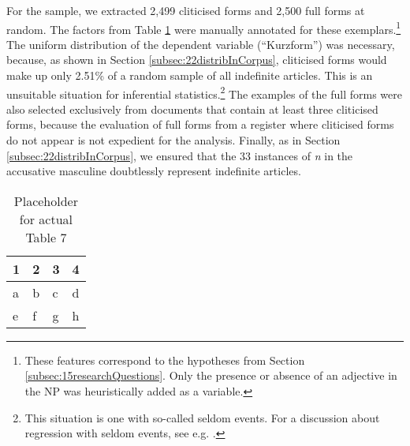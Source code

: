 For the sample, we extracted 2,499 cliticised forms and 2,500 full forms at random.
The factors from Table \ref{tab:0007} were manually annotated for these exemplars.\footnote{
	\label{fn:23} These features correspond to the hypotheses from Section \ref{subsec:15researchQuestions}. Only the presence or absence of an adjective in the NP was heuristically added as a variable.}
The uniform distribution of the dependent variable (``Kurzform'') was necessary, because, as shown in Section \ref{subsec:22distribInCorpus}, cliticised forms would make up only 2.51\% of a random sample of all indefinite articles.
This is an unsuitable situation for inferential statistics.\footnote{
	This situation is one with so-called seldom events. For a discussion about regression with seldom events, see e.g. \citet{KingZeng2001}.}
The examples of the full forms were also selected exclusively from documents that contain at least three cliticised forms, because the evaluation of full forms from a register where cliticised forms do not appear is not expedient for the analysis.
Finally, as in Section \ref{subsec:22distribInCorpus}, we ensured that the 33 instances of \textit{n} in the accusative masculine doubtlessly represent indefinite articles.

\begin{table}
	\centering
	\begin{tabular}{llll}
		\toprule
		\textbf{1} & \textbf{2} & \textbf{3} & \textbf{4} \\
		\midrule
		a & b & c & d \\
		e & f & g & h \\
		\bottomrule
	\end{tabular}
	\caption{Placeholder for actual Table 7}
	\label{tab:0007}
\end{table}

